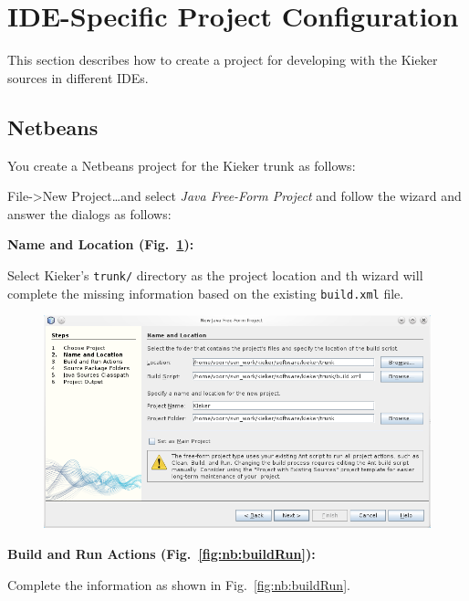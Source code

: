 \section{IDE-Specific Project Configuration}

This section describes how to create a project for developing with the 
Kieker sources in different IDEs.

\subsection{Netbeans}

You create a Netbeans project for the Kieker trunk as follows:

\begin{compactenum}
\item File->New Project\ldots and select \textit{Java Free-Form Project} and 
follow the wizard and answer the dialogs as follows:

\begin{compactenum}
\item \textbf{Name and Location (Fig.~\ref{fig:nb:location}):} %

Select Kieker's \texttt{trunk/} directory as the project location and th wizard will %
complete the missing information based on the existing \texttt{build.xml} file.

\begin{figure}[H]\centering
\includegraphics[scale=0.4]{figures/netbeans-NameAndLocation}
\caption{}
\label{fig:nb:location}
\end{figure}

\item \textbf{Build and Run Actions (Fig.~\ref{fig:nb:buildRun}):} %

Complete the information as shown in Fig.~\ref{fig:nb:buildRun}.


\end{compactenum}
\end{compactenum}
